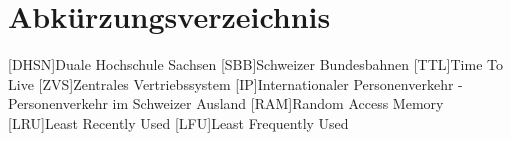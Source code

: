 \section*{Abkürzungsverzeichnis}

\begin{acronym}

  [DHSN]{Duale Hochschule Sachsen}
  [SBB]{Schweizer Bundesbahnen}
  [TTL]{Time To Live}
  [ZVS]{Zentrales Vertriebssystem}
  [IP]{Internationaler Personenverkehr - Personenverkehr im Schweizer Ausland}
  [RAM]{Random Access Memory}
  [LRU]{Least Recently Used}
  [LFU]{Least Frequently Used}

  
\end{acronym}

